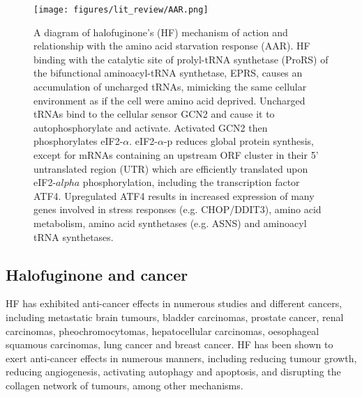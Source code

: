\begin{figure}[htb]
\centering
\texttt{[image: figures/lit\_review/AAR.png]}
\caption[Halofuginone and the amino acid response diagram]{A diagram of halofuginone's (HF) mechanism of action and relationship with the amino acid starvation response (AAR).
HF binding with the catalytic site of prolyl-tRNA synthetase (ProRS) of the bifunctional aminoacyl-tRNA synthetase, EPRS, causes an accumulation of uncharged tRNAs, mimicking the same cellular environment as if the cell were amino acid deprived.
Uncharged tRNAs bind to the cellular sensor GCN2 and cause it to autophosphorylate and activate.
Activated GCN2 then phosphorylates eIF2-$\alpha$.
eIF2-$\alpha$-p reduces global protein synthesis, except for mRNAs containing an upstream ORF cluster in their 5' untranslated region (UTR) which are efficiently translated upon eIF2-$alpha$ phosphorylation\cite{ye2015gcn2}, including the transcription factor ATF4.
Upregulated ATF4 results in increased expression of many genes involved in stress responses (e.g. CHOP/DDIT3), amino acid metabolism, amino acid synthetases (e.g. ASNS) and aminoacyl tRNA synthetases.
}
\label{fig:HF_AAR}\end{figure}


\subsection{Halofuginone and cancer}\label{sec:HF_cancer}

HF has exhibited anti-cancer effects in numerous studies and different cancers, including metastatic brain tumours, bladder carcinomas, prostate cancer, renal carcinomas, pheochromocytomas, hepatocellular carcinomas, oesophageal squamous carcinomas, lung cancer and breast cancer\cite{abramovitch2004halofuginone, elkin1999inhibition, gavish2002growth, genin2008myofibroblasts, gross2003treatment, nagler2004suppression, wang2020significance, demiroglu2020anticarcinogenic, xia2018halofuginone}.
HF has been shown to exert anti-cancer effects in numerous manners, including reducing tumour growth, reducing angiogenesis, activating autophagy and apoptosis, and disrupting the collagen network of tumours, among other mechanisms.

